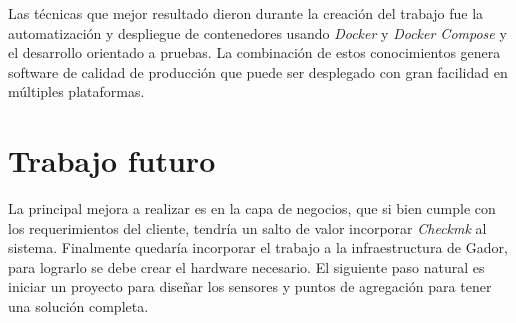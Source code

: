 Las técnicas que mejor resultado dieron durante la creación del trabajo fue la automatización y despliegue de contenedores usando \emph{Docker} y \emph{Docker Compose} y el desarrollo orientado a pruebas.
La combinación de estos conocimientos genera software de calidad de producción que puede ser desplegado con gran facilidad en múltiples plataformas.

\section{Trabajo futuro}

La principal mejora a realizar es en la capa de negocios, que si bien cumple con los requerimientos del cliente, tendría un salto de valor incorporar \emph{Checkmk} al sistema.
Finalmente quedaría incorporar el trabajo a la infraestructura de Gador, para lograrlo se debe crear el hardware necesario.
El siguiente paso natural es iniciar un proyecto para diseñar los sensores y puntos de agregación para tener una solución completa.